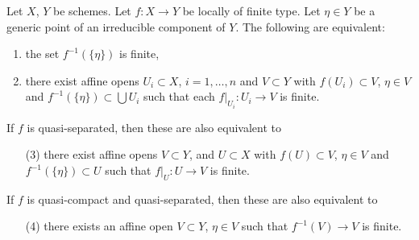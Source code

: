 \begin{lemma}
\label{lemma-generically-finite}
Let $X$, $Y$ be schemes.
Let $f : X \to Y$ be locally of finite type.
Let $\eta \in Y$ be a generic point of an irreducible component
of $Y$. The following are equivalent:
\begin{enumerate}
\item the set $f^{-1}(\{\eta\})$ is finite,
\item there exist affine opens $U_i \subset X$, $i = 1, \ldots, n$
and $V \subset Y$ with $f(U_i) \subset V$,
$\eta \in V$ and $f^{-1}(\{\eta\}) \subset \bigcup U_i$
such that each $f|_{U_i} : U_i \to V$ is finite.
\end{enumerate}
If $f$ is quasi-separated, then these are also equivalent to
\begin{enumerate}
\item[(3)] there exist affine opens $V \subset Y$,
and $U \subset X$ with $f(U) \subset V$,
$\eta \in V$ and $f^{-1}(\{\eta\}) \subset U$
such that $f|_U : U \to V$ is finite.
\end{enumerate}
If $f$ is quasi-compact and quasi-separated,
then these are also equivalent to
\begin{enumerate}
\item[(4)] there exists an affine open $V \subset Y$, $\eta \in V$
such that $f^{-1}(V) \to V$ is finite.
\end{enumerate}
\end{lemma}

